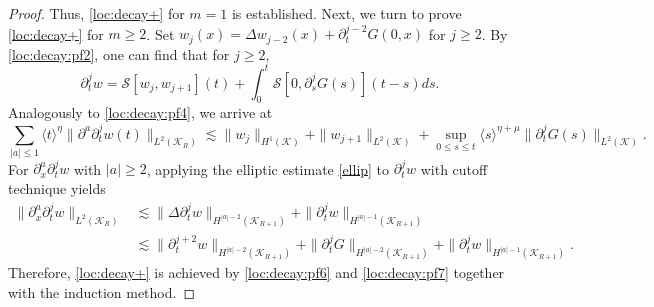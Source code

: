 \documentclass[11pt,twoside]{article}
\def\cK{\mathcal K}
\def\cS{\mathcal S}
\def\p{\partial}
\def\ls{\lesssim}
\newcommand{\w}[1]{\langle {#1} \rangle}
\theoremstyle{plain}
\theoremstyle{definition}
\numberwithin{equation}{section}
\begin{document}
\begin{proof}
Thus, \eqref{loc:decay+} for $m=1$ is established.
Next, we turn to prove \eqref{loc:decay+} for $m\ge2$.
Set $w_j(x)=\Delta w_{j-2}(x)+\p_t^{j-2}G(0,x)$ for $j\ge2$.
By \eqref{loc:decay:pf2}, one can find that for $j\ge2$,
\begin{equation}\label{loc:decay:pf5}
\p_t^jw=\cS[w_j,w_{j+1}](t)+\int_0^t\cS[0,\p_s^jG(s)](t-s)ds.
\end{equation}
Analogously to \eqref{loc:decay:pf4}, we arrive at
\begin{equation}\label{loc:decay:pf6}
\sum_{|a|\le 1}\w{t}^{\eta}\|\p^a\p_t^jw(t)\|_{L^2(\cK_R)}
\ls\|w_j\|_{H^{1}(\cK)}+\|w_{j+1}\|_{L^2(\cK)}+\sup_{0\le s\le t}\w{s}^{\eta+\mu}\|\p_t^jG(s)\|_{L^2(\cK)}.
\end{equation}
For $\p_x^a\p_t^jw$ with $|a|\ge2$, applying the elliptic estimate \eqref{ellip} to $\p_t^jw$ with cutoff technique yields
\begin{equation}\label{loc:decay:pf7}
\begin{split}
\|\p_x^a\p_t^jw\|_{L^2(\cK_R)}
&\ls\|\Delta\p_t^jw\|_{H^{|a|-2}(\cK_{R+1})}+\|\p_t^jw\|_{H^{|a|-1}(\cK_{R+1})}\\
&\ls\|\p_t^{j+2}w\|_{H^{|a|-2}(\cK_{R+1})}+\|\p_t^jG\|_{H^{|a|-2}(\cK_{R+1})}+\|\p_t^jw\|_{H^{|a|-1}(\cK_{R+1})}.
\end{split}
\end{equation}
Therefore, \eqref{loc:decay+} is achieved by \eqref{loc:decay:pf6} and \eqref{loc:decay:pf7} together with the induction method.
\end{proof}
\end{document}
